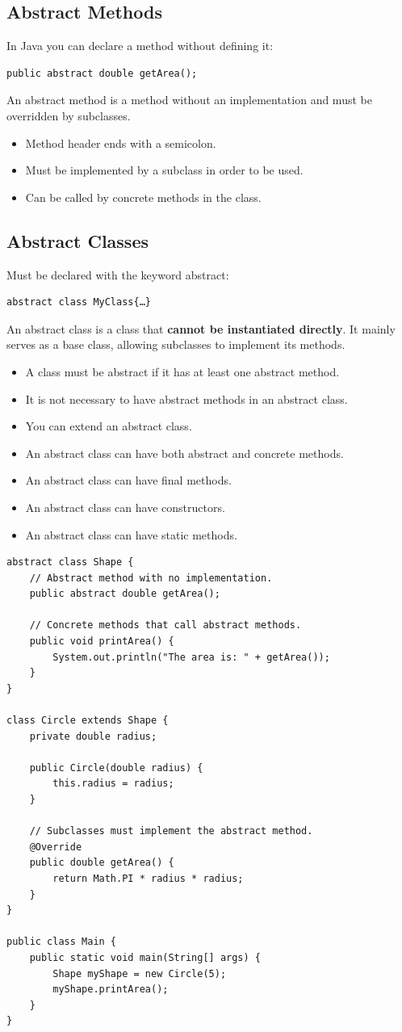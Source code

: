 \documentclass[letterpaper,12pt]{article}
\begin{document}
\subsection{Abstract Methods}
In Java you can declare a method without defining it:
\begin{verbatim}
public abstract double getArea();
\end{verbatim}
An abstract method is a method without an implementation and must be overridden by subclasses.
\begin{itemize}
    \item Method header ends with a semicolon.
    \item Must be implemented by a subclass in order to be used.
    \item Can be called by concrete methods in the class.
\end{itemize}

\subsection{Abstract Classes}
Must be declared with the keyword abstract:
\begin{verbatim}
abstract class MyClass{…}
\end{verbatim}
An abstract class is a class that \textbf{cannot be instantiated directly}. It mainly serves as a base class, allowing subclasses to implement its methods.
\begin{itemize}
    \item A class must be abstract if it has at least one abstract method.
    \item It is not necessary to have abstract methods in an abstract class.
    \item You can extend an abstract class.
    \item An abstract class can have both abstract and concrete methods.
    \item An abstract class can have final methods.
    \item An abstract class can have constructors.
    \item An abstract class can have static methods.
\end{itemize}
\begin{verbatim}
abstract class Shape {
    // Abstract method with no implementation.
    public abstract double getArea();

    // Concrete methods that call abstract methods.
    public void printArea() {
        System.out.println("The area is: " + getArea());
    }
}

class Circle extends Shape {
    private double radius;

    public Circle(double radius) {
        this.radius = radius;
    }

    // Subclasses must implement the abstract method.
    @Override
    public double getArea() {
        return Math.PI * radius * radius;
    }
}

public class Main {
    public static void main(String[] args) {
        Shape myShape = new Circle(5);
        myShape.printArea();
    }
}
\end{verbatim}
\end{document}
